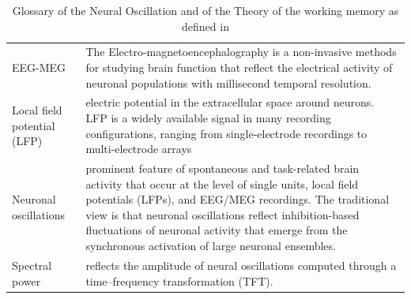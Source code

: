 \begin{table}[ht]
    \centering
    \begin{tabular}{@{}| p{4cm}|p{9cm}| @{}}
        \hline
        EEG-MEG                     & The Electro-magnetoencephalography is a non-invasive methods for studying brain function that reflect the electrical activity of neuronal populations with millisecond temporal resolution.                                                                                                                                                             \\

        Local field potential (LFP) & electric potential in the extracellular space around neurons. LFP is a widely available signal in many recording configurations, ranging from single-electrode recordings to multi-electrode arrays                                                                                                                                                     \\
        Neuronal oscillations       & prominent feature of spontaneous and task-related brain activity that occur at the level of single units, local field potentials (LFPs), and EEG/MEG recordings. The traditional view is that neuronal oscillations reflect inhibition-based fluctuations of neuronal activity that emerge from the synchronous activation of large neuronal ensembles. \\
        Spectral power              & reflects the amplitude of neural oscillations computed through a time–frequency transformation (TFT).                                                                                                                                                                                                                                                   \\
        \hline
    \end{tabular}
    \caption{Glossary of the Neural Oscillation and of the Theory of the working memory as defined in \cite{roux2014working}}
    \label{Tab:Glossary_theory}
\end{table}

